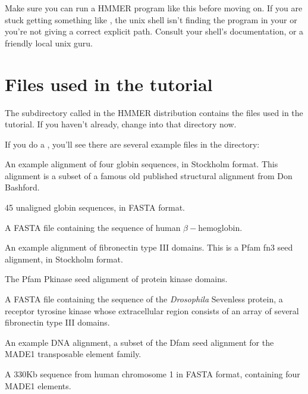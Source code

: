   \vspace{1ex}
  \vspace{1ex}

Make sure you can run a HMMER program like this before moving on.  If
you are stuck getting something like , the unix shell isn't finding the program in your 
or you're not giving a correct explicit path. Consult your shell's
documentation, or a friendly local unix guru.

\section{Files used in the tutorial}

The subdirectory called  in the HMMER distribution
contains the files used in the tutorial. If you haven't already,
change into that directory now. 

  \vspace{1ex}
  \vspace{1ex}

If you do a , you'll see there are several example files in
the  directory:

\begin{sreitems}{}
\item[\monob{globins4.sto}] An example alignment of four globin sequences, in
  Stockholm format. This alignment is a subset of a famous old
  published structural alignment from Don Bashford.\cite{Bashford87}
%
\item[\monob{globins45.fa}] 45 unaligned globin sequences, in FASTA
  format.
%
\item[\monob{HBB\_HUMAN}] A FASTA file containing the sequence of
  human $\beta-$hemoglobin.
%
\item[\monob{fn3.sto}] An example alignment of fibronectin type III
  domains. This is a Pfam fn3 seed alignment, in Stockholm format.
%
\item[\monob{Pkinase.sto}] The Pfam Pkinase seed alignment of protein
  kinase domains.
%
\item[\monob{7LESS\_DROME}] A FASTA file containing the sequence of
  the \emph{Drosophila} Sevenless protein, a receptor tyrosine kinase
  whose extracellular region consists of an array of several
  fibronectin type III domains.
%
\item[\monob{MADE1.sto}] An example DNA alignment, a subset
of the Dfam seed alignment for the MADE1 transposable element family. 
%
\item[\monob{dna\_target.fa}] A 330Kb sequence from human chromosome
  1 in FASTA format, containing four MADE1 elements.
\end{sreitems}


